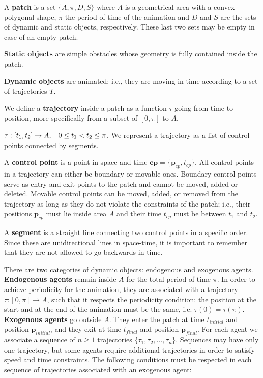 A \textbf{patch} is a set $\{ A, \pi, D, S\}$ where $A$ is a geometrical area with a convex polygonal shape, $\pi$ the period of time of the animation and $D$ and $S$ are the sets of dynamic and static objects, respectively.
These last two sets may be empty in case of an empty patch.

\textbf{Static objects} are simple obstacles whose geometry is fully contained inside the patch.

\textbf{Dynamic objects} are animated; i.e., they are moving in time according to a set of trajectories $T$.


We define a {\bf trajectory} inside a patch as a function $\tau$ going from time to position, more specifically from a subset of $[ 0,\pi ]$ to $A$.

$ \tau:[t_1,t_2]\rightarrow A, \hspace{0.3cm} 0 \leq t_1 < t_2 \leq \pi$.
We represent a trajectory as a list of control points connected by segments. 

A {\bf control point} is a point in space and time $\mathbf{cp} = \{\mathbf{p}_{cp}, t_{cp}\}$. All control points in a trajectory can either be boundary or movable ones. Boundary control points serve as entry and exit points to the patch and cannot be moved, added or deleted. Movable control points can be moved, added, or removed from the trajectory as long as they do not violate the constraints of the patch; i.e., their positions $\mathbf{p}_{cp}$ must lie inside area $A$ and their time $t_{cp}$ must be between $t_1$ and $t_2$.

A {\bf segment} is a straight line connecting two control points in a specific order. Since these are unidirectional lines in space-time, it is important to remember that they are not allowed to go backwards in time.

There are two categories of dynamic objects: endogenous and exogenous agents. {\bf Endogenous agents} remain inside $A$ for the total period of time $\pi$. In order to achieve periodicity for the animation, they are associated with a trajectory $\tau : [0,\pi] \rightarrow A$, such that it respects the periodicity condition: the position at the start and at the end of the animation must be the same, i.e. \mbox{$\tau (0) = \tau (\pi)$}.\\
{\bf Exogenous agents} go outside $A$. They enter the patch at time $t_{initial}$ and position $\mathbf{p}_{initial}$, and they exit at time $t_{final}$ and position $\mathbf{p}_{final}$. For each agent we associate a sequence of $n \ge 1$ trajectories $\{ \tau_1, \tau_2, \dots, \tau_n\}$. Sequences may have only one trajectory, but some agents require additional trajectories in order to satisfy speed and time constraints. The following conditions must be respected in each sequence of trajectories associated with an exogenous agent:

